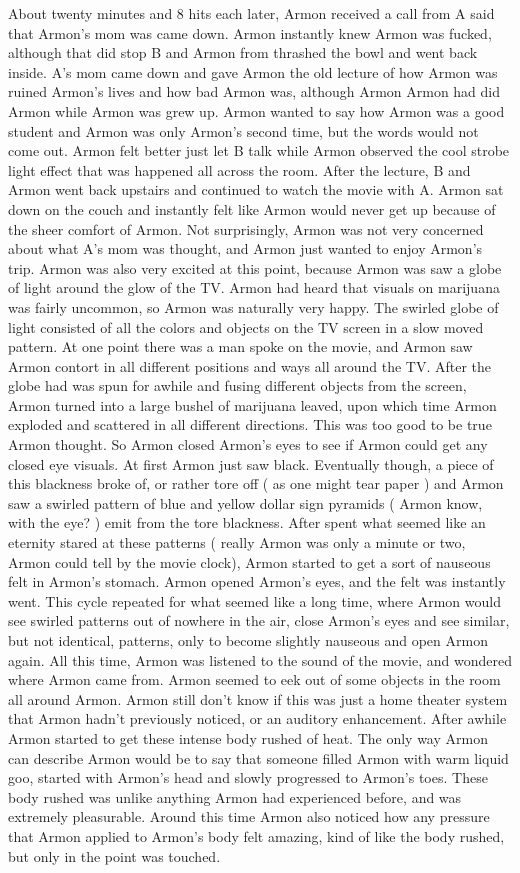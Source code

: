 \documentclass[12pt]{book}
\begin{document}
About twenty minutes and 8 hits each later, Armon received a call from A said that Armon's mom was came down. Armon instantly knew Armon was fucked, although that did stop B and Armon from thrashed the bowl and went back inside. A's mom came down and gave Armon the old lecture of how Armon was ruined Armon's lives and how bad Armon was, although Armon Armon had did Armon while Armon was grew up. Armon wanted to say how Armon was a good student and Armon was only Armon's second time, but the words would not come out. Armon felt better just let B talk while Armon observed the cool strobe light effect that was happened all across the room. After the lecture, B and Armon went back upstairs and continued to watch the movie with A. Armon sat down on the couch and instantly felt like Armon would never get up because of the sheer comfort of Armon. Not surprisingly, Armon was not very concerned about what A's mom was thought, and Armon just wanted to enjoy Armon's trip. Armon was also very excited at this point, because Armon was saw a globe of light around the glow of the TV. Armon had heard that visuals on marijuana was fairly uncommon, so Armon was naturally very happy. The swirled globe of light consisted of all the colors and objects on the TV screen in a slow moved pattern. At one point there was a man spoke on the movie, and Armon saw Armon contort in all different positions and ways all around the TV. After the globe had was spun for awhile and fusing different objects from the screen, Armon turned into a large bushel of marijuana leaved, upon which time Armon exploded and scattered in all different directions. This was too good to be true Armon thought. So Armon closed Armon's eyes to see if Armon could get any closed eye visuals. At first Armon just saw black. Eventually though, a piece of this blackness broke of, or rather tore off ( as one might tear paper ) and Armon saw a swirled pattern of blue and yellow dollar sign pyramids ( Armon know, with the eye? ) emit from the tore blackness. After spent what seemed like an eternity stared at these patterns ( really Armon was only a minute or two, Armon could tell by the movie clock), Armon started to get a sort of nauseous felt in Armon's stomach. Armon opened Armon's eyes, and the felt was instantly went. This cycle repeated for what seemed like a long time, where Armon would see swirled patterns out of nowhere in the air, close Armon's eyes and see similar, but not identical, patterns, only to become slightly nauseous and open Armon again. All this time, Armon was listened to the sound of the movie, and wondered where Armon came from. Armon seemed to eek out of some objects in the room all around Armon. Armon still don't know if this was just a home theater system that Armon hadn't previously noticed, or an auditory enhancement. After awhile Armon started to get these intense body rushed of heat. The only way Armon can describe Armon would be to say that someone filled Armon with warm liquid goo, started with Armon's head and slowly progressed to Armon's toes. These body rushed was unlike anything Armon had experienced before, and was extremely pleasurable. Around this time Armon also noticed how any pressure that Armon applied to Armon's body felt amazing, kind of like the body rushed, but only in the point was touched. 
\end{document}
